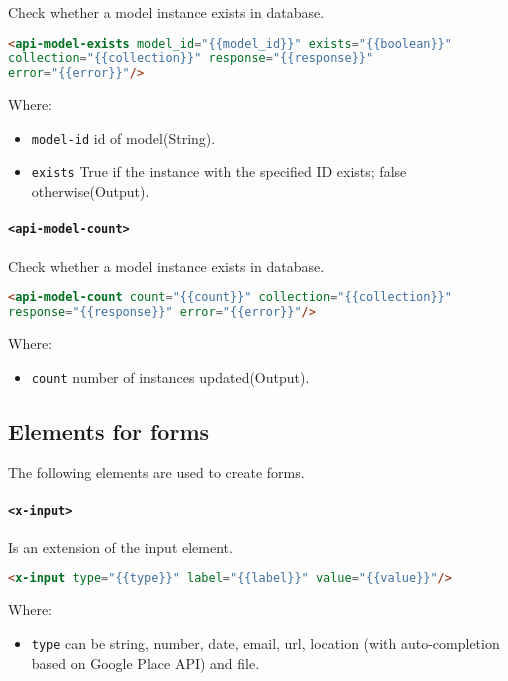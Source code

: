 Check whether a model instance exists in database.

\begin{lstlisting}[language=html]
<api-model-exists model_id="{{model_id}}" exists="{{boolean}}" 
collection="{{collection}}" response="{{response}}" 
error="{{error}}"/>
\end{lstlisting}
Where:
\begin{itemize}
\item \texttt{model-id} id of model(String).
\item \texttt{exists} True if the instance with the specified ID exists; false otherwise(Output).
\end{itemize}

\paragraph{\texttt{<api-model-count>}}

Check whether a model instance exists in database.

\begin{lstlisting}[language=html]
<api-model-count count="{{count}}" collection="{{collection}}" 
response="{{response}}" error="{{error}}"/>
\end{lstlisting}
Where:
\begin{itemize}
\item \texttt{count} number of instances updated(Output).
\end{itemize}

\subsection{Elements for forms}

The following elements are used to create forms.

\paragraph{\texttt{<x-input>}} 

Is an extension of the input element.
\begin{lstlisting}[language=html]
<x-input type="{{type}}" label="{{label}}" value="{{value}}"/>
\end{lstlisting}
Where:
\begin{itemize}
\item \texttt{type} can be string, number, date, email, url, location (with auto-completion based on Google Place API) and file.
\end{itemize}

